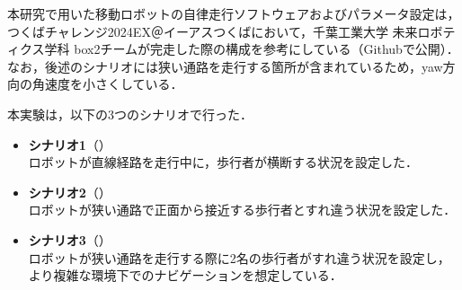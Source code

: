 
本研究で用いた移動ロボットの自律走行ソフトウェアおよびパラメータ設定は，つくばチャレンジ2024EX＠イーアスつくば\cite{つくばチャレンジ36:online}において，千葉工業大学 未来ロボティクス学科 box2チームが完走した際の構成を参考にしている（Github\cite{openrdco85:online}で公開）．なお，後述のシナリオには狭い通路を走行する箇所が含まれているため，yaw方向の角速度を小さくしている．

\newpage


本実験は，以下の3つのシナリオで行った．
\begin{itemize}
  \vspace{-10pt}
  \item \textbf{シナリオ1}（）\\
  ロボットが直線経路を走行中に，歩行者が横断する状況を設定した．
  \item \textbf{シナリオ2}（）\\
  ロボットが狭い通路で正面から接近する歩行者とすれ違う状況を設定した．
  \item \textbf{シナリオ3}（）\\
  ロボットが狭い通路を走行する際に2名の歩行者がすれ違う状況を設定し，より複雑な環境下でのナビゲーションを想定している．
\end{itemize}

\vspace{-5pt}

